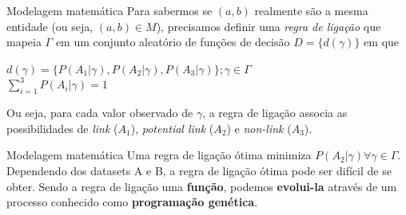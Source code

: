 \documentclass{beamer}
\begin{document}
  \begin{frame}{Modelagem matemática}
      Para sabermos se $(a,b)$ realmente são a mesma entidade (ou seja, $(a,b) \in M$), precisamos definir uma \textit{regra de ligação} que mapeia $\Gamma$ em um conjunto aleatório de funções de decisão $D = \{d(\gamma)\}$ em que
      \begin{center}
          $d(\gamma) = \{P(A_1|\gamma), P(A_2|\gamma), P(A_3|\gamma)\}; \gamma \in \Gamma$ \\
          $\sum\limits_{i=1}^3 P(A_i|\gamma) = 1$
      \end{center}
      Ou seja, para cada valor observado de $\gamma$, a regra de ligação associa as possibilidades de \textit{link} ($A_1$), \textit{potential link} ($A_2$) e \textit{non-link} ($A_3$).
  \end{frame}

  \begin{frame}{Modelagem matemática}
      Uma regra de ligação ótima minimiza $P(A_2|\gamma) \forall \gamma \in \Gamma$. Dependendo dos datasets A e B, a regra de ligação ótima pode ser difícil de se obter. Sendo a regra de ligação uma \textbf{função}, podemos \textbf{evolui-la} através de um processo conhecido como \textbf{programação genética}.
  \end{frame}
\end{document}
